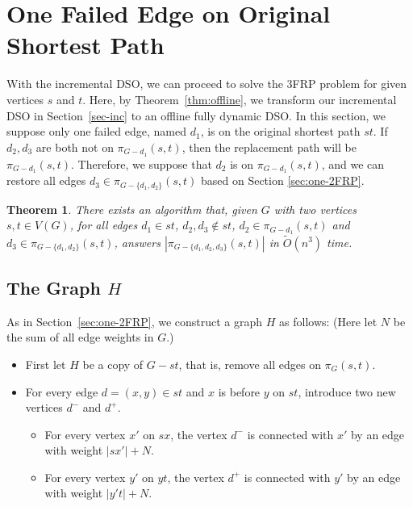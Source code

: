 \documentclass[11pt]{article}
\theoremstyle{plain}
\newtheorem{theorem}{Theorem}[section]
\theoremstyle{definition}
\newcommand{\too}[1]{\tilde{O}({#1})}
\newcommand{\set}[1]{\{ #1 \}}
\newcommand{\og}[3]{\pi_{G-#3}\left(#1,#2\right)}
\begin{document}
 \section{One Failed Edge on Original Shortest Path}\label{sec:1-edge}

With the incremental DSO, we can proceed to solve the 3FRP problem for given vertices $s$ and $t$. Here, by Theorem~\ref{thm:offline}, we transform our incremental DSO in Section~\ref{sec-inc} to an offline fully dynamic DSO. In this section, we suppose only one failed edge, named $d_1$, is on the original shortest path $st$. If $d_2, d_3$ are both not on $\og{s}{t}{d_1}$, then the replacement path will be $\og{s}{t}{d_1}$. Therefore, we suppose that $d_2$ is on $\og{s}{t}{d_1}$, and we can restore all edges $d_3 \in \og{s}{t}{\set{d_1, d_2}}$ based on Section \ref{sec:one-2FRP}.

\begin{theorem}
There exists an algorithm that, given $G$ with two vertices $s,t \in V(G)$, for all edges $d_1 \in st$, $d_2,d_3 \not \in st$, $d_2 \in \og{s}{t}{d_1}$ and $d_3 \in \og{s}{t}{\set{d_1, d_2}}$, answers $|\og{s}{t}{\set{d_1, d_2, d_3}}|$ in $\too{n^3}$ time.
\end{theorem}

\subsection{The Graph $H$}\label{sec2-1}

As in Section~\ref{sec:one-2FRP}, we construct a graph $H$ as follows: (Here let $N$ be the sum of all edge weights in $G$.)


\begin{itemize}
    \item First let $H$ be a copy of $G-st$, that is, remove all edges on $\pi_G(s,t)$.
    \item For every edge $d=(x,y)\in st$ and $x$ is before $y$ on $st$, introduce two new vertices $d^-$ and $d^+$. 
    \begin{itemize}
        \item For every vertex $x'$ on $sx$, the vertex $d^-$ is connected with $x'$ by an edge with weight $|sx'|+N$.
        \item For every vertex $y'$ on $yt$, the vertex $d^+$ is connected with $y'$ by an edge with weight $|y't|+N$.
    \end{itemize}
\end{itemize}
\end{document}
